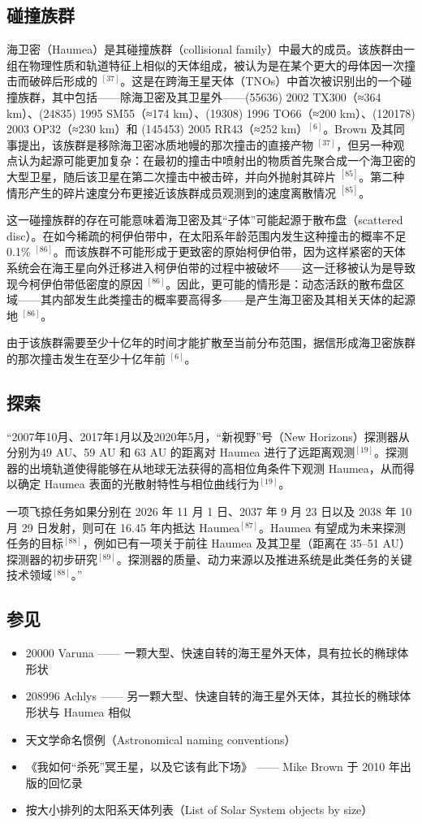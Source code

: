 \subsection{碰撞族群}
海卫密（Haumea）是其碰撞族群（collisional family）中最大的成员。该族群由一组在物理性质和轨道特征上相似的天体组成，被认为是在某个更大的母体因一次撞击而破碎后形成的 $^{[37]}$。这是在跨海王星天体（TNOs）中首次被识别出的一个碰撞族群，其中包括——除海卫密及其卫星外——(55636) 2002 TX300（≈364 km）、(24835) 1995 SM55（≈174 km）、(19308) 1996 TO66（≈200 km）、(120178) 2003 OP32（≈230 km）和 (145453) 2005 RR43（≈252 km）$^{[6]}$。Brown 及其同事提出，该族群是移除海卫密冰质地幔的那次撞击的直接产物 $^{[37]}$，但另一种观点认为起源可能更加复杂：在最初的撞击中喷射出的物质首先聚合成一个海卫密的大型卫星，随后该卫星在第二次撞击中被击碎，并向外抛射其碎片 $^{[85]}$。第二种情形产生的碎片速度分布更接近该族群成员观测到的速度离散情况 $^{[85]}$。

这一碰撞族群的存在可能意味着海卫密及其“子体”可能起源于散布盘（scattered disc）。在如今稀疏的柯伊伯带中，在太阳系年龄范围内发生这种撞击的概率不足 0.1\% $^{[86]}$。而该族群不可能形成于更致密的原始柯伊伯带，因为这样紧密的天体系统会在海王星向外迁移进入柯伊伯带的过程中被破坏——这一迁移被认为是导致现今柯伊伯带低密度的原因 $^{[86]}$。因此，更可能的情形是：动态活跃的散布盘区域——其内部发生此类撞击的概率要高得多——是产生海卫密及其相关天体的起源地 $^{[86]}$。

由于该族群需要至少十亿年的时间才能扩散至当前分布范围，据信形成海卫密族群的那次撞击发生在至少十亿年前 $^{[6]}$。
\subsection{探索}
“2007年10月、2017年1月以及2020年5月，“新视野”号（New Horizons）探测器从分别为49 AU、59 AU 和 63 AU 的距离对 Haumea 进行了远距离观测$^{[19]}$。探测器的出境轨道使得能够在从地球无法获得的高相位角条件下观测 Haumea，从而得以确定 Haumea 表面的光散射特性与相位曲线行为$^{[19]}$。

一项飞掠任务如果分别在 2026 年 11 月 1 日、2037 年 9 月 23 日以及 2038 年 10 月 29 日发射，则可在 16.45 年内抵达 Haumea$^{[87]}$。Haumea 有望成为未来探测任务的目标$^{[88]}$，例如已有一项关于前往 Haumea 及其卫星（距离在 35–51 AU）探测器的初步研究$^{[89]}$。探测器的质量、动力来源以及推进系统是此类任务的关键技术领域$^{[88]}$。”
\subsection{参见}
\begin{itemize}
\item 20000 Varuna —— 一颗大型、快速自转的海王星外天体，具有拉长的椭球体形状
\item 208996 Achlys —— 另一颗大型、快速自转的海王星外天体，其拉长的椭球体形状与 Haumea 相似
\item 天文学命名惯例（Astronomical naming conventions）
\item 《我如何“杀死”冥王星，以及它该有此下场》 —— Mike Brown 于 2010 年出版的回忆录
\item 按大小排列的太阳系天体列表（List of Solar System objects by size）
\end{itemize}
